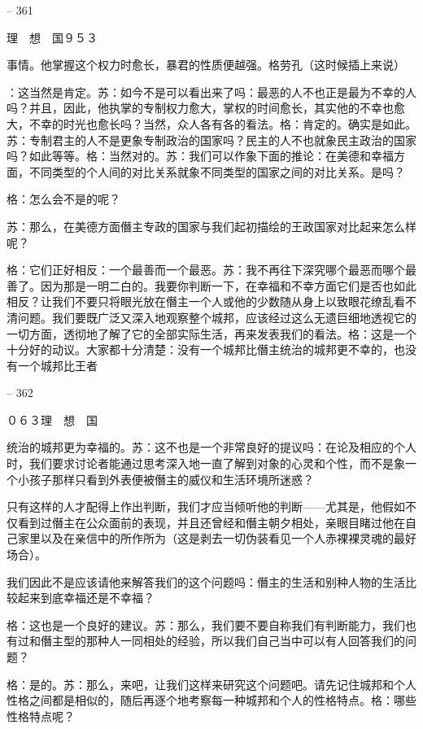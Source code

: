 \documentclass[11pt,oneside]{book}
\begin{document}
\begin{common-format}
    

-- 361

    理　想　国９５３

    事情。他掌握这个权力时愈长，暴君的性质便越强。格劳孔（这时候插上来说）

    ：这当然是肯定。苏：如今不是可以看出来了吗：最恶的人不也正是最为不幸的人吗？并且，因此，他执掌的专制权力愈大，掌权的时间愈长，其实他的不幸也愈大，不幸的时光也愈长吗？当然，众人各有各的看法。格：肯定的。确实是如此。苏：专制君主的人不是更象专制政治的国家吗？民主的人不也就象民主政治的国家吗？如此等等。格：当然对的。苏：我们可以作象下面的推论：在美德和幸福方面，不同类型的个人间的对比关系就象不同类型的国家之间的对比关系。是吗？

    格：怎么会不是的呢？

    苏：那么，在美德方面僭主专政的国家与我们起初描绘的王政国家对比起来怎么样呢？

    格：它们正好相反：一个最善而一个最恶。苏：我不再往下深究哪个最恶而哪个最善了。因为那是一明二白的。我要你判断一下，在幸福和不幸方面它们是否也如此相反？让我们不要只将眼光放在僭主一个人或他的少数随从身上以致眼花缭乱看不清问题。我们要既广泛又深入地观察整个城邦，应该经过这么无遗巨细地透视它的一切方面，透彻地了解了它的全部实际生活，再来发表我们的看法。格：这是一个十分好的动议。大家都十分清楚：没有一个城邦比僭主统治的城邦更不幸的，也没有一个城邦比王者

    

-- 362

    ０６３理　想　国

    统治的城邦更为幸福的。苏：这不也是一个非常良好的提议吗：在论及相应的个人时，我们要求讨论者能通过思考深入地一直了解到对象的心灵和个性，而不是象一个小孩子那样只看到外表便被僭主的威仪和生活环境所迷惑？

    只有这样的人才配得上作出判断，我们才应当倾听他的判断——尤其是，他假如不仅看到过僭主在公众面前的表现，并且还曾经和僭主朝夕相处，亲眼目睹过他在自己家里以及在亲信中的所作所为（这是剥去一切伪装看见一个人赤裸裸灵魂的最好场合）。

    我们因此不是应该请他来解答我们的这个问题吗：僭主的生活和别种人物的生活比较起来到底幸福还是不幸福？

    格：这也是一个良好的建议。苏：那么，我们要不要自称我们有判断能力，我们也有过和僭主型的那种人一同相处的经验，所以我们自己当中可以有人回答我们的问题？

    格：是的。苏：那么，来吧，让我们这样来研究这个问题吧。请先记住城邦和个人性格之间都是相似的，随后再逐个地考察每一种城邦和个人的性格特点。格：哪些性格特点呢？


\end{common-format}
\end{document}
